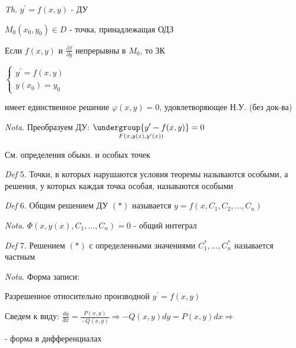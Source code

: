 \documentclass[12pt]{article}
\begin{document}
    \vspace{3mm}
\textit{Th}. $\displaystyle y^\prime = f(x, y)$ - ДУ

    $\displaystyle M_0(x_0, y_0) \in D$ - точка, принадлежащая ОДЗ

    Если $f(x, y)$ и $\displaystyle \frac{\partial f}{\partial y}$ непрерывны в $\displaystyle M_0$, то ЗК

    $\displaystyle \begin{cases}y^\prime = f(x, y) \\ y(x_0) = y_0\end{cases}$

    имеет единственное решение $\varphi(x, y) = 0$, удовлетворяющее Н.У. (без док-ва)

    \vspace{3mm}
\textit{Nota}. Преобразуем ДУ: $\displaystyle \underset{F(x, y(x), y^\prime(x))}{\undergroup{y^\prime - f(x, y)}} = 0$

    См. определения обыкн. и особых точек

    \vspace{3mm}
\textit{Def} 5. Точки, в которых нарушаются условия теоремы называются особыми, а решения, у которых каждая точка особая,
    называются особыми

    \vspace{3mm}
\textit{Def} 6. Общим решением ДУ $(*)$ называется $\displaystyle y = f(x, C_1, C_2, \dots, C_n)$

    \vspace{3mm}
\textit{Nota}. $\displaystyle \Phi(x, y(x), C_1, \dots, C_n) = 0$ - общий интеграл

    \vspace{3mm}
\textit{Def} 7. Решением $(*)$ с определенными значениями $\displaystyle C_1^*, \dots, C_n^*$ называется частным

    \vspace{3mm}
\textit{Nota}. Форма записи:

    Разрешенное относительно производной $\displaystyle y^\prime = f(x, y)$

    Сведем к виду: $\displaystyle \frac{dy}{dx} = \frac{P(x, y)}{-Q(x, y)} \Longrightarrow -Q(x, y)dy = P(x, y)dx \Longrightarrow $

     - форма в дифференциалах
\end{document}
